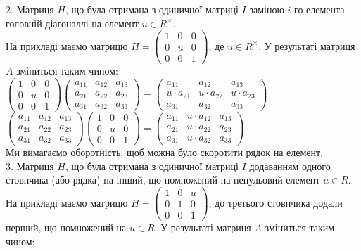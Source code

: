 \documentclass{math_library}
\begin{document}
2. Матриця $H$, що була отримана з одиничної матриці $I$ заміною $i$-го елемента головній діагоналлі на елемент $u \in R^\times$.\\
На прикладі маємо матрицю $H = \begin{pmatrix}
1 & 0 & 0 \\
0 & u & 0 \\
0 & 0 & 1
\end{pmatrix}$, де $u \in R^\times$. У результаті матриця $A$ зміниться таким чином: \\
$\begin{pmatrix}
1 & 0 & 0 \\
0 & u & 0 \\
0 & 0 & 1
\end{pmatrix} \begin{pmatrix}
a_{11} & a_{12} & a_{13} \\
a_{21} & a_{22} & a_{23} \\
a_{31} & a_{32} & a_{33} 
\end{pmatrix} = \begin{pmatrix}
a_{11} & a_{12} & a_{13} \\
u \cdot a_{21} & u \cdot a_{22} & u \cdot a_{23} \\
a_{31} & a_{32} & a_{33} 
\end{pmatrix}$\\
$\begin{pmatrix}
a_{11} & a_{12} & a_{13} \\
a_{21} & a_{22} & a_{23} \\
a_{31} & a_{32} & a_{33} 
\end{pmatrix} \begin{pmatrix}
1 & 0 & 0 \\
0 & u & 0 \\
0 & 0 & 1
\end{pmatrix} = \begin{pmatrix}
a_{11} & u \cdot a_{12} & a_{13} \\
a_{21} & u \cdot a_{22} & a_{23} \\
a_{31} & u \cdot a_{32} & a_{33} 
\end{pmatrix}$\\
Ми вимагаємо оборотність, щоб можна було скоротити рядок на елемент.
\bigskip \\
3. Матриця $H$, що була отримана з одиничної матриці $I$ додаванням одного стовпчика (або рядка) на інший, що помножений на ненульовий елемент $u \in R$.\\
На прикладі маємо матрицю $H = \begin{pmatrix}
1 & 0 & u \\
0 & 1 & 0 \\
0 & 0 & 1
\end{pmatrix}$, до третього стовпчика додали перший, що помножений на $u \in R$. У результаті матриця $A$ зміниться таким чином:\\
\end{document}
